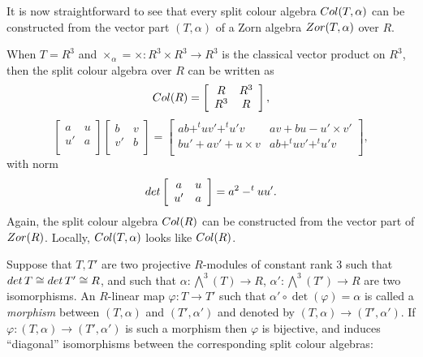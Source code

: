 \documentclass[10pt]{amsart}
\theoremstyle{plain}
\theoremstyle{definition}
\begin{document}
It is now straightforward to see that every split colour algebra ${\rm Col}(T,\alpha)$ can be constructed from the vector part $(T,\alpha)$ of a Zorn algebra ${\rm Zor}(T,\alpha)$ over $R$.

When $T=R^3$ and $\times_\alpha=\times:R^3\times R^3\rightarrow R^3$ is the classical vector product on $R^3$, then the split colour algebra  over $R$  can be written as
\[
{\rm Col}(R)=
\left [\begin {array}{cc}
 R & R^3\\
R^3  &  R \\
\end {array}\right ],
\]
\[
\left [\begin {array}{cc}
 a & u\\
u'  &  a \\
\end {array}\right ]
\left [\begin {array}{cc}
 b & v\\
v'  &  b \\
\end {array}\right ]
=
\left [\begin {array}{cc}
 ab+ ^tuv'+^tu'v & av+bu-u'\times v'\\
bu' +av'+u\times v & ab+ ^tuv'+^tu'v \\
\end {array}\right ],
\]
with norm
\[
{\rm det}
\left [\begin {array}{cc}
 a & u\\
u'  &  a \\
\end {array}\right ]=
a^2-^tu u'.
\]
Again, the split colour algebra ${\rm Col}(R)$ can be constructed from the vector part of ${\rm Zor}(R)$. Locally, ${\rm Col}(T,\alpha)$ looks like ${\rm Col}(R)$.

Suppose that $T,T'$ are two  projective $R$-modules of constant rank 3 such that ${\rm det}\,T\cong {\rm det}\,T'\cong R $, and such that
 $\alpha:\bigwedge^3 (T)\rightarrow R $, $\alpha':\bigwedge^3 (T')\rightarrow R $ are two isomorphisms.
An $R$-linear map $\varphi: T\rightarrow T' $ such that $\alpha'\circ \det (\varphi)=\alpha$ is called a \emph{morphism} between $(T,\alpha)$ and $(T',\alpha') $ and denoted by $ (T,\alpha)\rightarrow (T',\alpha') $.
   If $\varphi: (T,\alpha)\rightarrow (T',\alpha') $
 is such a morphism then $\varphi$ is bijective, and induces ``diagonal'' isomorphisms between the corresponding split colour algebras:
\end{document}

